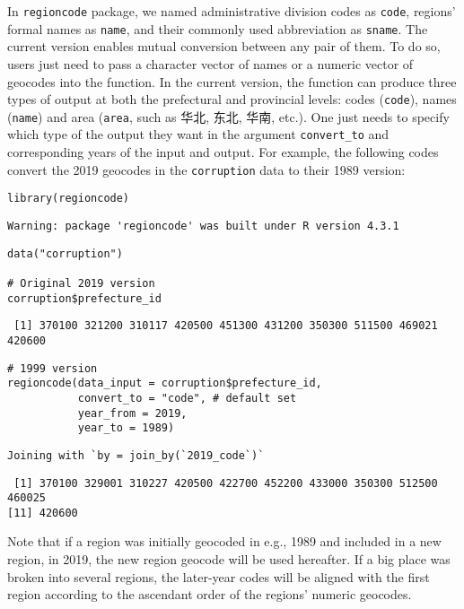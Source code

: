 \documentclass[
  article]{jss}
\begin{document}
In \texttt{regioncode} package, we named administrative division codes
as \texttt{code}, regions' formal names as \texttt{name}, and their
commonly used abbreviation as \texttt{sname}. The current version
enables mutual conversion between any pair of them. To do so, users just
need to pass a character vector of names or a numeric vector of geocodes
into the function. In the current version, the function can produce
three types of output at both the prefectural and provincial levels:
codes (\texttt{code}), names (\texttt{name}) and area (\texttt{area},
such as 华北, 东北, 华南, etc.). One just needs to specify which type of
the output they want in the argument \texttt{convert\_to} and
corresponding years of the input and output. For example, the following
codes convert the 2019 geocodes in the \texttt{corruption} data to their
1989 version:

\begin{verbatim}
library(regioncode)
\end{verbatim}

\begin{verbatim}
Warning: package 'regioncode' was built under R version 4.3.1
\end{verbatim}

\begin{verbatim}
data("corruption")

# Original 2019 version
corruption$prefecture_id
\end{verbatim}

\begin{verbatim}
 [1] 370100 321200 310117 420500 451300 431200 350300 511500 469021 420600
\end{verbatim}

\begin{verbatim}
# 1999 version
regioncode(data_input = corruption$prefecture_id, 
           convert_to = "code", # default set
           year_from = 2019,
           year_to = 1989)
\end{verbatim}

\begin{verbatim}
Joining with `by = join_by(`2019_code`)`
\end{verbatim}

\begin{verbatim}
 [1] 370100 329001 310227 420500 422700 452200 433000 350300 512500 460025
[11] 420600
\end{verbatim}

Note that if a region was initially geocoded in e.g., 1989 and included
in a new region, in 2019, the new region geocode will be used hereafter.
If a big place was broken into several regions, the later-year codes
will be aligned with the first region according to the ascendant order
of the regions' numeric geocodes.
\end{document}
